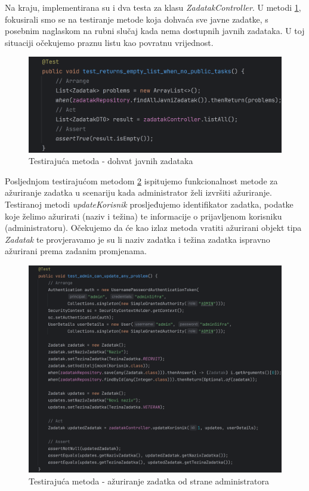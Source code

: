 Na kraju, implementirana su i dva testa za klasu \textit{ZadatakController}. U metodi \ref{fig:test6}, fokusirali smo se na testiranje metode koja dohvaća sve javne zadatke, s posebnim naglaskom na rubni slučaj kada nema dostupnih javnih zadataka. U toj situaciji očekujemo praznu listu kao povratnu vrijednost.

\begin{figure}[H]
	\includegraphics[scale=0.2]{slike/test6.png}
	\centering
	\caption{Testirajuća metoda - dohvat javnih zadataka}
	\label{fig:test6}
\end{figure}

Posljednjom testirajućom metodom \ref{fig:test7} ispitujemo funkcionalnost metode za ažuriranje zadatka u scenariju kada administrator želi izvršiti ažuriranje. Testiranoj metodi \textit{updateKorisnik} prosljeđujemo identifikator zadatka, podatke koje želimo ažurirati (naziv i težina) te informacije o prijavljenom korisniku (administratoru). Očekujemo da će kao izlaz metoda vratiti ažurirani objekt tipa \textit{Zadatak} te provjeravamo je su li naziv zadatka i težina zadatka ispravno ažurirani prema zadanim promjenama.


\begin{figure}[H]
	\includegraphics[scale=0.13]{slike/test7.png}
	\centering
	\caption{Testirajuća metoda - ažuriranje zadatka od strane administratora}
	\label{fig:test7}
\end{figure}

